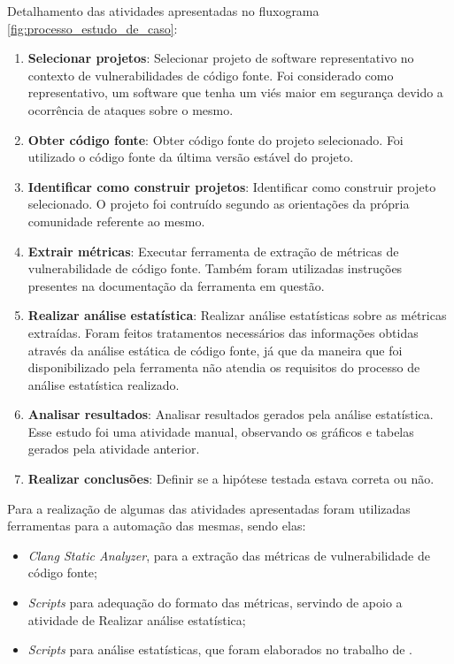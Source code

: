 Detalhamento das atividades apresentadas no fluxograma
\ref{fig:processo_estudo_de_caso}:

\begin{enumerate}\label{desc_processo}
  \item \textbf{Selecionar projetos}: Selecionar projeto de software representativo no contexto de
    vulnerabilidades de código fonte. Foi considerado como representativo, um
    software que tenha um viés maior em segurança devido a ocorrência de ataques
    sobre o mesmo.
  \item \textbf{Obter código fonte}: Obter código fonte do projeto selecionado. Foi utilizado o código fonte
  da última versão estável do projeto.
  \item \textbf{Identificar como construir projetos}: Identificar como construir projeto selecionado. O projeto foi contruído
    segundo as orientações da própria comunidade referente ao mesmo.
  \item \textbf{Extrair métricas}: Executar ferramenta de extração de métricas de vulnerabilidade de código
    fonte. Também foram utilizadas instruções presentes na documentação da
    ferramenta em questão.
  \item \textbf{Realizar análise estatística}: Realizar análise estatísticas sobre as métricas extraídas. Foram feitos
    tratamentos necessários das informações obtidas através da análise estática
    de código fonte, já que da maneira que foi disponibilizado pela ferramenta
    não atendia os requisitos do processo de análise estatística realizado.
  \item \textbf{Analisar resultados}: Analisar resultados gerados pela análise
    estatística. Esse estudo foi uma atividade
    manual, observando os gráficos e tabelas gerados pela atividade anterior.
  \item \textbf{Realizar conclusões}: Definir se a hipótese testada estava correta ou não.
\end{enumerate}

Para a realização de algumas das atividades apresentadas foram utilizadas
ferramentas para a automação das mesmas, sendo elas:

\begin{itemize}
  \item \textit{Clang Static Analyzer}, para a extração das métricas de
    vulnerabilidade de código fonte;
  \item \textit{Scripts} para adequação do formato das métricas, servindo de
    apoio a atividade de Realizar análise estatística;
  \item \textit{Scripts} para análise estatísticas, que foram elaborados no
    trabalho de .
\end{itemize}

